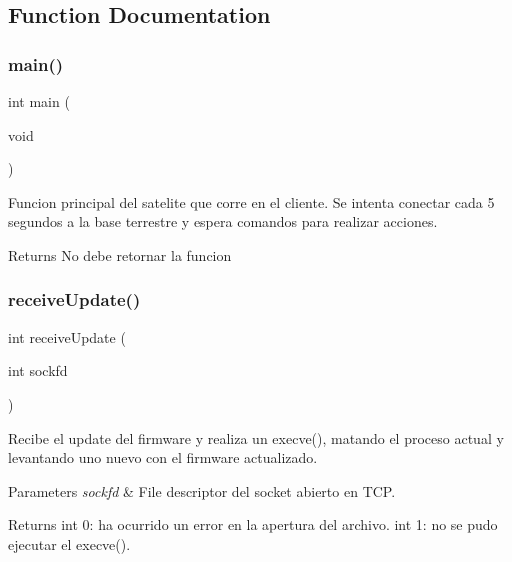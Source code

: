 \subsection{Function Documentation}
\mbox{\label{client_2main_8c_a840291bc02cba5474a4cb46a9b9566fe}} 
\subsubsection{main()}
{\footnotesize\ttfamily int main (\begin{DoxyParamCaption}\item[{void}]{ }\end{DoxyParamCaption})}



Funcion principal del satelite que corre en el cliente. Se intenta conectar cada 5 segundos a la base terrestre y espera comandos para realizar acciones. 

\begin{DoxyReturn}{Returns}
No debe retornar la funcion 
\end{DoxyReturn}
\mbox{\label{client_2main_8c_a503ea6ede263f06f33bcc00dc8262f5a}} 
\subsubsection{receiveUpdate()}
{\footnotesize\ttfamily int receive\+Update (\begin{DoxyParamCaption}\item[{int}]{sockfd }\end{DoxyParamCaption})}



Recibe el update del firmware y realiza un execve(), matando el proceso actual y levantando uno nuevo con el firmware actualizado. 


\begin{DoxyParams}{Parameters}
{\em sockfd} & File descriptor del socket abierto en T\+CP. \\
\hline
\end{DoxyParams}
\begin{DoxyReturn}{Returns}
int 0\+: ha ocurrido un error en la apertura del archivo. int 1\+: no se pudo ejecutar el execve(). 
\end{DoxyReturn}
\mbox{\label{client_2main_8c_aee43a5dbf2f80157778c8bf26a07b90f}} 

